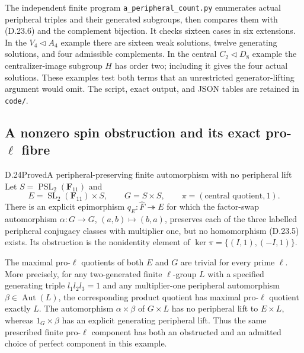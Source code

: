 The independent finite program \texttt{a\_peripheral\_count.py}
enumerates actual peripheral triples and their generated subgroups,
then compares them with \textup{(D.23.6)} and the complement
bijection.  It checks sixteen cases in six extensions.  In the
$V_4\triangleleft A_4$ example there are sixteen weak solutions,
twelve generating solutions, and four admissible complements.  In
the central $C_2\triangleleft D_8$ example the centralizer-image
subgroup $H$ has order two; including it gives the four actual
solutions.  These examples test both terms that an unrestricted
generator-lifting argument would omit.  The script, exact output,
and JSON tables are retained in \texttt{code/}.

\subsection{A nonzero spin obstruction and its exact \texorpdfstring{pro-$\ell$}{pro-ell} fibre}

\begin{statement}{D.24}{Proved}{A peripheral-preserving finite automorphism with no peripheral lift}
Let $S=\operatorname{PSL}_2(\mathbf F_{11})$ and
\[
 E=\operatorname{SL}_2(\mathbf F_{11})\times S,
 \qquad G=S\times S,
 \qquad\pi=(\text{central quotient},1).
 \tag{D.24.1}
\]
There is an explicit epimorphism $q_E:\widehat F\twoheadrightarrow E$
for which the factor-swap automorphism
$\alpha:G\to G$, $(a,b)\mapsto(b,a)$, preserves each of the
three labelled peripheral conjugacy classes with multiplier one,
but no homomorphism \textup{(D.23.5)} exists.  Its obstruction is
the nonidentity element of $\ker\pi=\{(I,1),(-I,1)\}$.

The maximal pro-$\ell$ quotients of both $E$ and $G$ are trivial
for every prime $\ell$.  More precisely, for any two-generated
finite $\ell$-group $L$ with a specified generating triple
$l_1l_2l_3=1$ and any multiplier-one peripheral automorphism
$\beta\in\operatorname{Aut}(L)$, the corresponding product
quotient has maximal pro-$\ell$ quotient exactly $L$.
The automorphism $\alpha\times\beta$ of $G\times L$ has no
peripheral lift to $E\times L$, whereas $1_G\times\beta$ has
an explicit generating peripheral lift.  Thus the same prescribed
finite pro-$\ell$ component has both an obstructed and an admitted
choice of perfect component in this example.
\end{statement}

